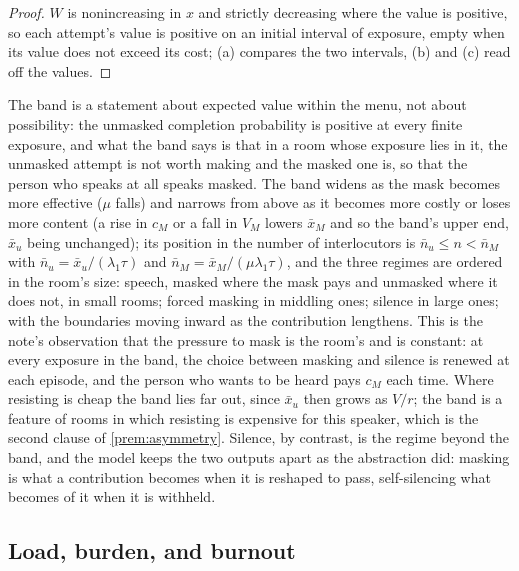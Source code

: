 \begin{proof}
$W$ is nonincreasing in $x$ and strictly decreasing where the value is positive, so each attempt's value is positive on an initial interval of exposure, empty when its value does not exceed its cost; (a) compares the two intervals, (b) and (c) read off the values.
\end{proof}

The band is a statement about expected value within the menu, not about possibility: the unmasked completion probability is positive at every finite exposure, and what the band says is that in a room whose exposure lies in it, the unmasked attempt is not worth making and the masked one is, so that the person who speaks at all speaks masked. The band widens as the mask becomes more effective ($\mu$ falls) and narrows from above as it becomes more costly or loses more content (a rise in $c_M$ or a fall in $V_M$ lowers $\bar{x}_M$ and so the band's upper end, $\bar{x}_u$ being unchanged); its position in the number of interlocutors is $\bar{n}_u \le n < \bar{n}_M$ with $\bar{n}_u = \bar{x}_u/(\lambda_1\tau)$ and $\bar{n}_M = \bar{x}_M/(\mu\lambda_1\tau)$, and the three regimes are ordered in the room's size: speech, masked where the mask pays and unmasked where it does not, in small rooms; forced masking in middling ones; silence in large ones; with the boundaries moving inward as the contribution lengthens. This is the note's observation that the pressure to mask is the room's and is constant: at every exposure in the band, the choice between masking and silence is renewed at each episode, and the person who wants to be heard pays $c_M$ each time. Where resisting is cheap the band lies far out, since $\bar{x}_u$ then grows as $V/r$; the band is a feature of rooms in which resisting is expensive for this speaker, which is the second clause of \autoref{prem:asymmetry}. Silence, by contrast, is the regime beyond the band, and the model keeps the two outputs apart as the abstraction did: masking is what a contribution becomes when it is reshaped to pass, self-silencing what becomes of it when it is withheld.

\subsection{Load, burden, and burnout}

